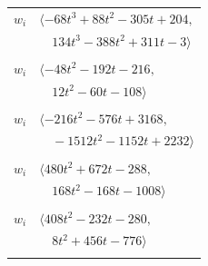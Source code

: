\documentclass[11pt]{article}
\begin{document}
\begin{longtable}{@{}ll@{}}
$w_i$ & $\langle -68t^{3}+88t^{2}-305t+204,$\\
 & $\quad 134t^{3}-388t^{2}+311t-3\rangle$\\
\addlinespace[2pt]
\multicolumn{2}{@{}p{0.97\textwidth}@{}}{$i=5$, $D_i=4$, $\rho_{ij}$: $3{:}2, \allowbreak 14{:}1, \allowbreak 17{:}2, \allowbreak 22{:}1, \allowbreak 26{:}2, \allowbreak 27{:}1, \allowbreak 29{:}2, \allowbreak 31{:}2, \allowbreak 32{:}2, \allowbreak 36{:}1, \allowbreak 37{:}2, \allowbreak 45{:}1, \allowbreak 49{:}1$}\\
$w_i$ & $\langle -48t^{2}-192t-216,$\\
 & $\quad 12t^{2}-60t-108\rangle$\\
\addlinespace[2pt]
\multicolumn{2}{@{}p{0.97\textwidth}@{}}{$i=6$, $D_i=8$, $\rho_{ij}$: $3{:}1, \allowbreak 4{:}2, \allowbreak 12{:}1, \allowbreak 16{:}1, \allowbreak 18{:}1, \allowbreak 27{:}2, \allowbreak 32{:}1, \allowbreak 34{:}2, \allowbreak 40{:}2, \allowbreak 43{:}2, \allowbreak 47{:}1, \allowbreak 48{:}2, \allowbreak 54{:}2, \allowbreak 55{:}1, \allowbreak 58{:}2$}\\
$w_i$ & $\langle -216t^{2}-576t+3168,$\\
 & $\quad -1512t^{2}-1152t+2232\rangle$\\
\addlinespace[2pt]
\multicolumn{2}{@{}p{0.97\textwidth}@{}}{$i=7$, $D_i=4$, $\rho_{ij}$: $0{:}2, \allowbreak 3{:}2, \allowbreak 14{:}1, \allowbreak 16{:}2, \allowbreak 25{:}1, \allowbreak 29{:}2, \allowbreak 30{:}2, \allowbreak 37{:}2, \allowbreak 40{:}2, \allowbreak 48{:}2, \allowbreak 54{:}1, \allowbreak 56{:}2, \allowbreak 57{:}1$}\\
$w_i$ & $\langle 480t^{2}+672t-288,$\\
 & $\quad 168t^{2}-168t-1008\rangle$\\
\addlinespace[2pt]
\multicolumn{2}{@{}p{0.97\textwidth}@{}}{$i=8$, $D_i=4$, $\rho_{ij}$: $0{:}2, \allowbreak 4{:}1, \allowbreak 12{:}2, \allowbreak 15{:}2, \allowbreak 17{:}2, \allowbreak 19{:}2, \allowbreak 23{:}2, \allowbreak 29{:}1, \allowbreak 32{:}2, \allowbreak 46{:}1, \allowbreak 54{:}2, \allowbreak 55{:}1, \allowbreak 56{:}1$}\\
$w_i$ & $\langle 408t^{2}-232t-280,$\\
 & $\quad 8t^{2}+456t-776\rangle$\\
\addlinespace[2pt]
\multicolumn{2}{@{}p{0.97\textwidth}@{}}{$i=9$, $D_i=4$, $\rho_{ij}$: $17{:}2, \allowbreak 29{:}1, \allowbreak 31{:}2, \allowbreak 33{:}2, \allowbreak 50{:}2, \allowbreak 52{:}1, \allowbreak 56{:}2$}\\

\end{longtable}
\end{document}
